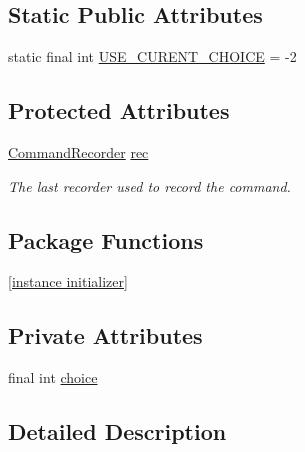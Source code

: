 \subsection*{Static Public Attributes}
\begin{DoxyCompactItemize}
\item 
static final int \hyperlink{classgov_1_1nasa_1_1jpf_1_1inspector_1_1client_1_1commands_1_1_cmd_choice_select_a0b120ead5754a831aeb7021179e9ab9f}{U\+S\+E\+\_\+\+C\+U\+R\+E\+N\+T\+\_\+\+C\+H\+O\+I\+CE} = -\/2
\end{DoxyCompactItemize}
\subsection*{Protected Attributes}
\begin{DoxyCompactItemize}
\item 
\hyperlink{classgov_1_1nasa_1_1jpf_1_1inspector_1_1client_1_1_command_recorder}{Command\+Recorder} \hyperlink{classgov_1_1nasa_1_1jpf_1_1inspector_1_1client_1_1_client_command_af4246f2427035c72a6af45a2c61361f7}{rec}
\begin{DoxyCompactList}\small\item\em The last recorder used to record the command. \end{DoxyCompactList}\end{DoxyCompactItemize}
\subsection*{Package Functions}
\begin{DoxyCompactItemize}
\item 
\hyperlink{classgov_1_1nasa_1_1jpf_1_1inspector_1_1client_1_1commands_1_1_cmd_choice_select_a5d02c4c0c2dcc508540c62758606c8a5}{\mbox{[}instance initializer\mbox{]}}
\end{DoxyCompactItemize}
\subsection*{Private Attributes}
\begin{DoxyCompactItemize}
\item 
final int \hyperlink{classgov_1_1nasa_1_1jpf_1_1inspector_1_1client_1_1commands_1_1_cmd_choice_select_ae6fd217c673bc63e67a1b7c54ea78376}{choice}
\end{DoxyCompactItemize}


\subsection{Detailed Description}


